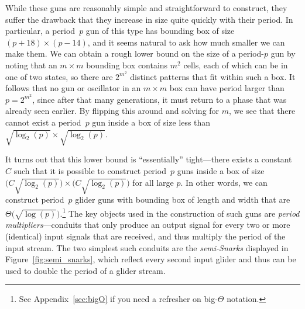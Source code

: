 While these guns are reasonably simple and straightforward to construct, they suffer the drawback that they increase in size quite quickly with their period. In particular, a period~$p$ gun of this type has bounding box of size $(p+18) \times (p-14)$, and it seems natural to ask how much smaller we can make them. We can obtain a rough lower bound on the size of a period-$p$ gun by noting that an $m \times m$ bounding box contains $m^2$ cells, each of which can be in one of two states, so there are $2^{m^2}$ distinct patterns that fit within such a box. It follows that no gun or oscillator in an $m \times m$ box can have period larger than $p = 2^{m^2}$, since after that many generations, it must return to a phase that was already seen earlier. By flipping this around and solving for $m$, we see that there cannot exist a period~$p$ gun inside a box of size less than $\sqrt{\log_2(p)} \times \sqrt{\log_2(p)}$.

It turns out that this lower bound is ``essentially'' tight---there exists a constant $C$ such that it is possible to construct period~$p$ guns inside a box of size $\big(C\sqrt{\log_2(p)}\big) \times \big(C\sqrt{\log_2(p)}\big)$ for all large $p$. In other words, we can construct period~$p$ glider guns with bounding box of length and width that are $\Theta\big(\sqrt{\log(p)}\big)$.\footnote{See Appendix~\ref{sec:bigO} if you need a refresher on big-$\Theta$ notation.} The key objects used in the construction of such guns are \emph{period multipliers}---conduits that only produce an output signal for every two or more (identical) input signals that are received, and thus multiply the period of the input stream. The two simplest such conduits are the \emph{semi-Snarks} displayed in Figure~\ref{fig:semi_snarks}, which reflect every second input glider and thus can be used to double the period of a glider stream.


